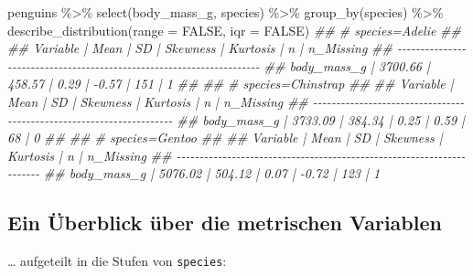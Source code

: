 \documentclass[
  a4paper,
  DIV=11]{scrreprt}
\newenvironment{Shaded}{\begin{snugshade}}{\end{snugshade}}
\newcommand{\AttributeTok}[1]{\textcolor[rgb]{0.40,0.45,0.13}{#1}}
\newcommand{\ConstantTok}[1]{\textcolor[rgb]{0.56,0.35,0.01}{#1}}
\newcommand{\DocumentationTok}[1]{\textcolor[rgb]{0.37,0.37,0.37}{\textit{#1}}}
\newcommand{\FunctionTok}[1]{\textcolor[rgb]{0.28,0.35,0.67}{#1}}
\newcommand{\NormalTok}[1]{\textcolor[rgb]{0.00,0.23,0.31}{#1}}
\newcommand{\SpecialCharTok}[1]{\textcolor[rgb]{0.37,0.37,0.37}{#1}}
\theoremstyle{definition}
\theoremstyle{remark}
\begin{document}
\begin{Shaded}
\begin{Highlighting}[]
\NormalTok{penguins }\SpecialCharTok{\%\textgreater{}\%} 
  \FunctionTok{select}\NormalTok{(body\_mass\_g, species) }\SpecialCharTok{\%\textgreater{}\%} 
  \FunctionTok{group\_by}\NormalTok{(species) }\SpecialCharTok{\%\textgreater{}\%} 
  \FunctionTok{describe\_distribution}\NormalTok{(}\AttributeTok{range =} \ConstantTok{FALSE}\NormalTok{, }\AttributeTok{iqr =} \ConstantTok{FALSE}\NormalTok{)}
\DocumentationTok{\#\# \# species=Adelie}
\DocumentationTok{\#\# }
\DocumentationTok{\#\# Variable    |    Mean |     SD | Skewness | Kurtosis |   n | n\_Missing}
\DocumentationTok{\#\# {-}{-}{-}{-}{-}{-}{-}{-}{-}{-}{-}{-}{-}{-}{-}{-}{-}{-}{-}{-}{-}{-}{-}{-}{-}{-}{-}{-}{-}{-}{-}{-}{-}{-}{-}{-}{-}{-}{-}{-}{-}{-}{-}{-}{-}{-}{-}{-}{-}{-}{-}{-}{-}{-}{-}{-}{-}{-}{-}{-}{-}{-}{-}{-}{-}{-}{-}{-}{-}{-}}
\DocumentationTok{\#\# body\_mass\_g | 3700.66 | 458.57 |     0.29 |    {-}0.57 | 151 |         1}
\DocumentationTok{\#\# }
\DocumentationTok{\#\# \# species=Chinstrap}
\DocumentationTok{\#\# }
\DocumentationTok{\#\# Variable    |    Mean |     SD | Skewness | Kurtosis |  n | n\_Missing}
\DocumentationTok{\#\# {-}{-}{-}{-}{-}{-}{-}{-}{-}{-}{-}{-}{-}{-}{-}{-}{-}{-}{-}{-}{-}{-}{-}{-}{-}{-}{-}{-}{-}{-}{-}{-}{-}{-}{-}{-}{-}{-}{-}{-}{-}{-}{-}{-}{-}{-}{-}{-}{-}{-}{-}{-}{-}{-}{-}{-}{-}{-}{-}{-}{-}{-}{-}{-}{-}{-}{-}{-}{-}}
\DocumentationTok{\#\# body\_mass\_g | 3733.09 | 384.34 |     0.25 |     0.59 | 68 |         0}
\DocumentationTok{\#\# }
\DocumentationTok{\#\# \# species=Gentoo}
\DocumentationTok{\#\# }
\DocumentationTok{\#\# Variable    |    Mean |     SD | Skewness | Kurtosis |   n | n\_Missing}
\DocumentationTok{\#\# {-}{-}{-}{-}{-}{-}{-}{-}{-}{-}{-}{-}{-}{-}{-}{-}{-}{-}{-}{-}{-}{-}{-}{-}{-}{-}{-}{-}{-}{-}{-}{-}{-}{-}{-}{-}{-}{-}{-}{-}{-}{-}{-}{-}{-}{-}{-}{-}{-}{-}{-}{-}{-}{-}{-}{-}{-}{-}{-}{-}{-}{-}{-}{-}{-}{-}{-}{-}{-}{-}}
\DocumentationTok{\#\# body\_mass\_g | 5076.02 | 504.12 |     0.07 |    {-}0.72 | 123 |         1}
\end{Highlighting}
\end{Shaded}

\hypertarget{ein-uxfcberblick-uxfcber-die-metrischen-variablen}{%
\subsection{Ein Überblick über die metrischen
Variablen}\label{ein-uxfcberblick-uxfcber-die-metrischen-variablen}}

\ldots{} aufgeteilt in die Stufen von \texttt{species}:
\end{document}
